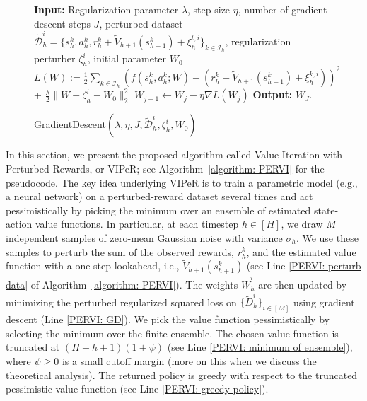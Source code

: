 \documentclass{article} \usepackage{iclr2023/iclr2023_conference,times}
\begin{document}
\begin{wrapfigure}{R}{0.5\textwidth}
\vspace{-20pt}
\begin{minipage}{0.5\textwidth}
\begin{algorithm}[H]
\begin{algorithmic}[1]
\State \textbf{Input:} Regularization parameter $\lambda$, step size $\eta$, number of gradient descent steps $J$, perturbed dataset $\tilde{\mathcal{D}}^i_h = \{s^k_h,a^k_h, r^k_h + \tilde{V}_{h+1}(s^k_{h+1}) + \xi^{t, i}_h\}_{k \in \mathcal{I}_h}$, regularization perturber $\zeta^i_h$, initial parameter $W_0$ 
\State $L(W) := \frac{1}{2}\sum_{k \in \mathcal{I}_h} ( f(s^k_h, a^k_h; W) - (r^k_h + \tilde{V}_{h+1}(s^k_{h+1}) + \xi^{k, i}_h) )^2 $ + $\frac{\lambda}{2} \| W + \zeta^i_h - W_0 \|_2^2$
\State $W_{j+1} \leftarrow W_j - \eta \nabla L(W_j)$
\EndFor 
\State \textbf{Output:} $W_J$. 
\caption{GradientDescent$(\lambda, \eta, J, \tilde{\mathcal{D}}^i_h, \zeta^i_h, W_0)$}
\label{algo:GD}
\end{algorithmic}
\end{algorithm}
\end{minipage}
\end{wrapfigure}

In this section, we present the proposed algorithm called Value Iteration with Perturbed Rewards, or VIPeR; see Algorithm~\ref{algorithm: PERVI} for the pseudocode. The key idea underlying VIPeR is to train a parametric model (e.g., a neural network) on a perturbed-reward dataset several times and act pessimistically by picking the minimum over an ensemble of estimated state-action value functions. 
In particular, at each timestep $h \in [H]$, we draw $M$ independent samples of zero-mean Gaussian noise with variance $\sigma_h$. We use these samples to perturb the sum of the observed rewards, $r^k_h$, and the estimated value function with a one-step lookahead, i.e.,  $\tilde{V}_{h+1}(s^k_{h+1})$ (see Line \ref{PERVI: perturb data} of Algorithm~\ref{algorithm: PERVI}). The weights $\tilde{W}^i_h$ are then updated by minimizing the perturbed regularized squared loss on $\{\tilde{D}^i_h \}_{i \in [M]}$ using gradient descent (Line \ref{PERVI: GD}). We pick the value function pessimistically by selecting the minimum over the finite ensemble. The chosen value function is truncated at $(H - h +1)(1 + \psi)$ (see Line \ref{PERVI: minimum of ensemble}), where $\psi \geq 0$ is a small cutoff margin (more on this when we discuss the theoretical analysis). The returned policy is greedy with respect to the truncated pessimistic value function (see Line \ref{PERVI: greedy policy}).
\end{document}
